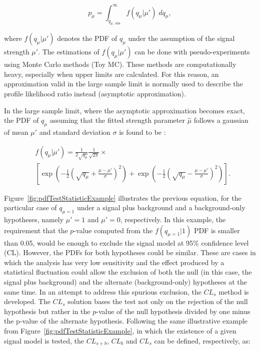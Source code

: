 \begin{equation}
p_\mu = \int_{q_{\mu,\;\text{obs}}}^{\infty}{f(q_\mu|\mu')\;dq_\mu},
\label{eq:pValueDefinition}
\end{equation}

\noindent where $f(q_\mu|\mu')$ denotes the PDF of $q_\mu$ under the assumption of the signal strength $\mu'$.
The estimations of $f(q_\mu|\mu')$ can be done with pseudo-experiments using Monte Carlo methods (Toy MC).
These methods are computationally heavy, especially when upper limits are calculated.
For this reason, an approximation valid in the large sample limit is normally used to describe the profile likelihood ratio instead (asymptotic approximation).

In the large sample limit, where the asymptotic approximation becomes exact, the PDF of $q_\mu$ assuming that the fitted strength parameter $\hat{\mu}$ follows a gaussian of mean $\mu'$ and standard deviation $\sigma$ is found to be \cite{Cowan:2010js}:

\begin{equation}
\begin{split}
&f(q_\mu|\mu')  = 
\frac{1}{2\sqrt{q_\mu}}\frac{1}{\sqrt{2\pi}} \times \\
& \left[\exp{\left(-\frac{1}{2}\left(\sqrt{q_\mu}+\frac{\mu-\mu'}{\sigma}\right)^2 \right)} 
+ \exp{\left(-\frac{1}{2}\left(\sqrt{q_\mu}-\frac{\mu-\mu'}{\sigma}\right)^2 \right)} \right].
\end{split}
\label{eq:pdfTestStatistic}
\end{equation}

Figure~\ref{fig:pdfTestStatisticExample} illustrates the previous equation, for the particular case of $q_{\mu=1}$ under a signal plus background and a background-only hypotheses, namely $\mu'=1$ and $\mu'=0$, respectively.
In this example, the requirement that the $p$-value computed from the $f(q_{\mu=1}|1)$ PDF is smaller than 0.05, would be enough to exclude the signal model at 95\% confidence level (CL).
However, the PDFs for both hypotheses could be similar.
These are cases in which the analysis has very low sensitivity and the effect produced by a statistical fluctuation could allow the exclusion of both the null (in this case, the signal plus background) and the alternate (background-only) hypotheses at the same time.
In an attempt to address this spurious exclusion, the $CL_s$ method is developed.
The $CL_s$ solution bases the test not only on the rejection of the null hypothesis but rather in the $p$-value of the null hypothesis divided by one minus the p-value of the alternate hypothesis.
Following the same illustrative example from Figure~\ref{fig:pdfTestStatisticExample}, in which the existence of a given signal model is tested, the $CL_{s+b}$, $CL_{b}$ and $CL_{s}$ can be defined, respectively, as:

